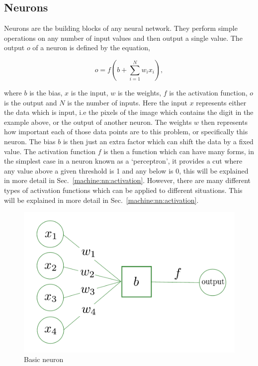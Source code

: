 \subsection{\label{machine:nn:neuron}Neurons}

Neurons are the building blocks of any neural network.
They perform simple operations on any number of input values and then output a single value.
The output $o$ of a neuron is defined by the equation,

\begin{equation}
    o = f\left(b + \sum_{i=1}^{N} w_i x_i  \right),
    \label{machine:nn:neuron:equation}
\end{equation}

where $b$ is the bias, $x$ is the input, $w$ is the weights, $f$ is the activation function, $o$ is the output and $N$ is the number of inputs.
Here the input $x$ represents either the data which is input, i.e the pixels of the image which contains the digit in the example above, or the output of another neuron.
The weights $w$ then represents how important each of those data points are to this problem, or specifically this neuron. 
The bias $b$ is then just an extra factor which can shift the data by a fixed value.
The activation function $f$ is then a function which can have many forms, in the simplest case in a neuron known as a `perceptron', it provides a cut where any value above a given threshold is 1 and any below is 0, this will be explained in more detail in Sec.~\ref{machine:nn:activation}. 
However, there are many different types of activation functions which can be applied to different situations.
This will be explained in more detail in Sec.~\ref{machine:nn:activation}.

\begin{figure}[h]
    \centering
    \includegraphics[width=0.6\columnwidth]{C4_cnn/neuron.pdf}
    \caption{Basic neuron}
    \label{machine:nn:neuron:plot}
\end{figure}

